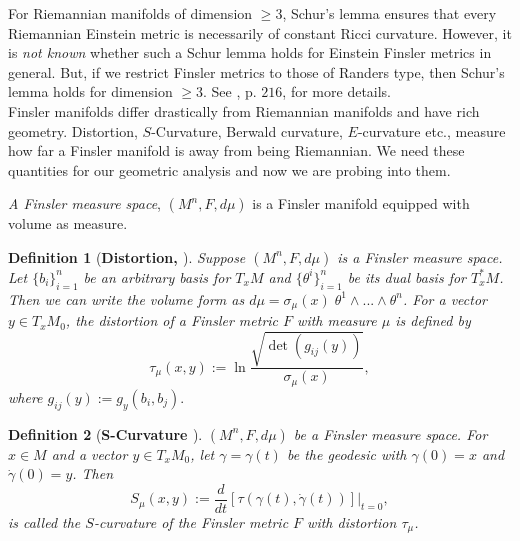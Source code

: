 \documentclass[pdflatex,sn-mathphys-num]{sn-jnl}%
\theoremstyle{thmstyleone}%
\theoremstyle{thmstyletwo}%
\theoremstyle{thmstylethree}%
\newtheorem{definition}{Definition}%
\begin{document}
\vspace{0.15in}	
 For  Riemannian manifolds of dimension $\geq 3$,   Schur's lemma ensures that every Riemannian Einstein metric is necessarily of constant
	Ricci curvature. However, it is {\it not known} whether such a Schur 
	lemma holds for Einstein Finsler metrics in general.  But, if we restrict 
	Finsler metrics  to those of Randers type, then Schur's lemma holds for dimension $\geq 3$. See \cite{boa}, p. $216$, for more details.\\




 
Finsler manifolds differ drastically
from Riemannian manifolds and 
 have rich geometry. Distortion, $S$-Curvature,
 Berwald curvature, $E$-curvature etc., measure how far a Finsler manifold is away from being Riemannian. 
 We need these quantities for our geometric analysis and now we are probing into them.
\vspace{0.15in}	

 {\it A Finsler measure space},
 $(M^n,F,d\mu)$ is a Finsler manifold equipped with volume 
 as measure.
 
 



\begin{definition}[\textbf{Distortion,  \cite[\boldmath p. $117$]{SSZ}}]
     Suppose $(M^n,F,d\mu)$ is a Finsler measure space. 
  Let $\{b_i\}_{i=1}^n$ be an arbitrary basis for $T_xM$ 
  and $\{\theta^i\}_{i=1}^n$ be its dual basis for $T_x^\ast M$. Then we can write the volume form as $d\mu ={\sigma}_{\mu}(x) \; \theta^1\wedge...\wedge\theta^n $. 
  For a vector $y \in T_xM_0$, the distortion of a Finsler metric $F$ with measure $\mu$ is defined by 
     $$\tau_{\mu}(x,y):=\ln \frac{\sqrt{\operatorname{det}(g_{ij}(y))}}{\sigma_{\mu}(x)},$$
where $g_{ij}(y):=g_y(b_i,b_j).$
 \end{definition}
 
 \vspace{0.15in}	
 
 
\begin{definition}[\textbf{S-Curvature \cite[\boldmath p. $118$]{SSZ}}]
$(M^n,F,d\mu)$ be a Finsler measure space.
    For $x\in M$ and a vector $y\in T_x M_0$, let $\gamma=\gamma(t)$ be the geodesic with $\gamma(0)=x$ and $\dot{\gamma}(0)=y$. Then
    $$S_{\mu}(x,y):=\frac{d}{dt}\left[\tau(\gamma(t),\dot{\gamma}(t))\right]\Bigr|_{t=0},$$
is called the $S$-curvature of the Finsler metric $F$
with distortion ${\tau}_{\mu}$.
\end{definition}
\end{document}
